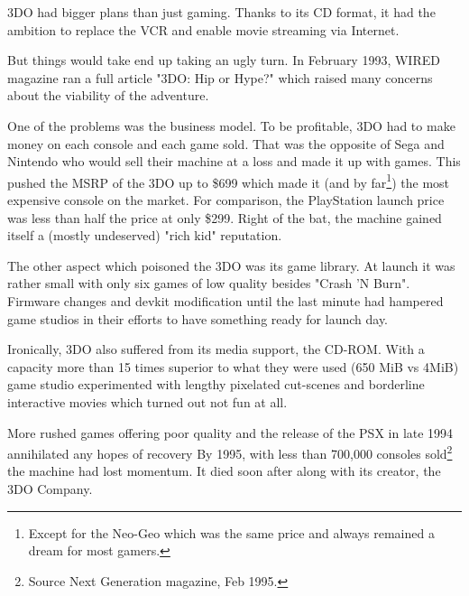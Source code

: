 \par
 3DO had bigger plans than just gaming. Thanks to its CD format, it had the ambition to replace the VCR and enable movie streaming via Internet.\\
\par
But things would take end up taking an ugly turn. In February 1993, WIRED magazine ran a full article "3DO: Hip or Hype?" which raised many concerns about the viability of the adventure.\\
\par
One of the problems was the business model. To be profitable, 3DO had to make money on each console and each game sold. That was the opposite of Sega and Nintendo who would sell their machine at a loss and made it up with games. This pushed the MSRP of the 3DO up to \$699 which made it (and by far\footnote{Except for the Neo-Geo which was the same price and always remained a dream for most gamers.}) the most expensive console on the market. For comparison, the PlayStation launch price was less than half the price at only \$299. Right of the bat, the machine gained itself a (mostly undeserved) "rich kid" reputation.\\
\par
The other aspect which poisoned the 3DO was its game library. At launch it was rather small with only six games of low quality besides "Crash 'N Burn". Firmware changes and devkit modification until the last minute had hampered game studios in their efforts to have something ready for launch day.\\
\par
Ironically, 3DO also suffered from its media support, the CD-ROM. With a capacity more than 15 times superior to what they were used (650 MiB vs 4MiB) game studio experimented with lengthy pixelated cut-scenes and borderline interactive movies which turned out not fun at all.\\
\par
More rushed games offering poor quality and the release of the PSX in late 1994 annihilated any hopes of recovery
By 1995, with less than 700,000 consoles sold\footnote{Source Next Generation magazine, Feb 1995.} the machine had lost momentum. It died soon after along with its creator, the 3DO Company.






